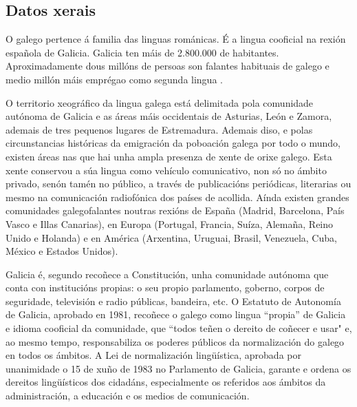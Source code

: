 \clearpage


\begin{multicols}{2}

\subsection{Datos xerais}

    O galego pertence á familia das linguas románicas. É a lingua cooficial na rexión española de Galicia. Galicia ten máis de 2.800.000 de habitantes. Aproximadamente dous millóns de persoas son falantes habituais de galego e medio millón máis emprégao como segunda lingua \cite{GAL-Nota5,GAL-Nota6}.


O territorio xeográfico da lingua galega está delimitada pola comunidade autónoma de Galicia e as áreas máis occidentais de Asturias, León e Zamora, ademais de tres pequenos lugares de Estremadura. Ademais diso, e polas circunstancias históricas da emigración da poboación galega por todo o mundo, existen áreas nas que hai unha ampla presenza de xente de orixe galego. Esta xente conservou a súa lingua como vehículo comunicativo, non só no ámbito privado, senón tamén no público, a través de publicacións periódicas, literarias ou mesmo na comunicación radiofónica dos países de acollida. Aínda existen grandes comunidades galegofalantes noutras rexións de España (Madrid, Barcelona, País Vasco e Illas Canarias), en Europa (Portugal, Francia, Suíza, Alemaña, Reino Unido e Holanda) e en América (Arxentina, Uruguai, Brasil, Venezuela, Cuba, México e Estados Unidos).
 
Galicia é, segundo recoñece a Constitución, unha comunidade autónoma que conta con institucións propias: o seu propio parlamento, goberno, corpos de seguridade, televisión e radio públicas, bandeira, etc. O Estatuto de Autonomía de Galicia, aprobado en 1981, recoñece o galego como lingua “propia” de Galicia e idioma cooficial da comunidade, que “todos teñen o dereito de coñecer e usar" e, ao mesmo tempo, responsabiliza os poderes públicos da normalización do galego en todos os ámbitos. A Lei de normalización lingüística, aprobada por unanimidade o 15 de xuño de 1983 no Parlamento de Galicia, garante e ordena os dereitos lingüísticos dos cidadáns, especialmente os referidos aos ámbitos da administración, a educación e os medios de comunicación. 


\end{multicols}
